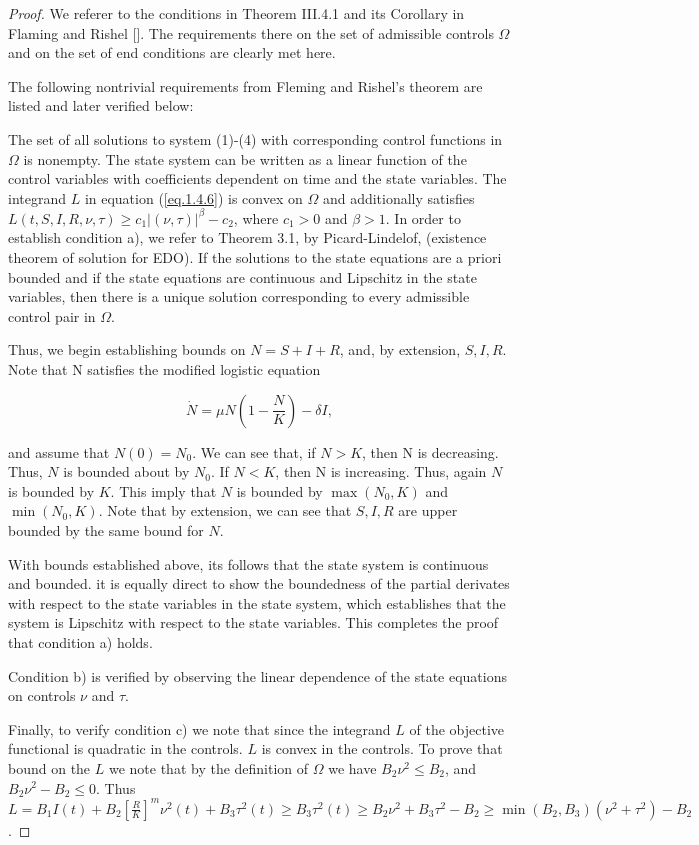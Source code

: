 \begin{proof}
We referer to the conditions in Theorem III.4.1 and its Corollary in Flaming 
and Rishel []. The requirements there on the set of admissible controls 
$\Omega$ and on the set of end conditions are clearly met here.

The following nontrivial requirements from Fleming and Rishel’s theorem are 
listed and later verified below:

The set of all solutions to system (1)-(4) with corresponding control functions 
in $\Omega$ is nonempty.
The state system can be written as a linear function of the control variables 
with coefficients dependent on time and the state variables.
The integrand $L$ in equation (\ref{eq.1.4.6}) is convex on $\Omega$ and 
additionally satisfies $L(t,S,I,R,\nu,\tau) \geq c_1 |(\nu,\tau)|^{\beta}-c_2$, 
where $c_1>0$ and $\beta>1$.
In order to establish condition a), we refer to Theorem 3.1, by 
Picard-Lindelof, (existence theorem of solution for EDO). If the solutions to 
the state equations are a priori bounded and if the state equations are 
continuous and Lipschitz in the state variables, then there is a unique 
solution corresponding to every admissible control pair in $\Omega$.

Thus, we begin establishing bounds on $N=S+I+R$, and, by extension, $S,I,R$. 
Note that N satisfies the modified logistic equation

\begin{equation}\label{eq.1.4.8}
\dot{N}=\mu N(1-\frac{N}{K})-\delta I,
\end{equation}

and assume that $N(0)=N_0$. We can see that, if $N>K$, then N is decreasing. 
Thus, $N$ is bounded about by $N_0$. If $N<K$, then N is increasing. Thus, 
again $N$ is bounded by $K$. This imply that $N$ is bounded by $\max (N_0,K)$ 
and $\min (N_0,K)$. Note that by extension, we can see that $S,I,R$ are upper 
bounded by the same bound for $N$.

With bounds established above, its follows that the state system is continuous 
and bounded. it is equally direct to show the boundedness of the partial 
derivates with respect to the state variables in the state system, which 
establishes that the system is Lipschitz with respect to the state variables. 
This completes the proof that condition a) holds.

Condition b) is verified by observing the linear dependence of the state 
equations on controls $\nu$ and  $\tau$.

Finally, to verify condition c) we note that since the integrand $L$ of the 
objective functional is quadratic in the controls. $L$ is convex in the 
controls. To prove that bound on the $L$ we note that by the definition of 
$\Omega$ we have $B_2 \nu^2\leq B_2$, and $B_2\nu^2-B_2\leq 0$. Thus $L=B_1 
I(t)+B_2[\frac{R}{K}]^m \nu^2(t) +B_3\tau^2(t)\geq B_3\tau^2 (t)\geq 
B_2\nu^2+B_3\tau^2-B_2\geq \min (B_2,B_3)(\nu^2+\tau^2)-B_2$.
\end{proof}

